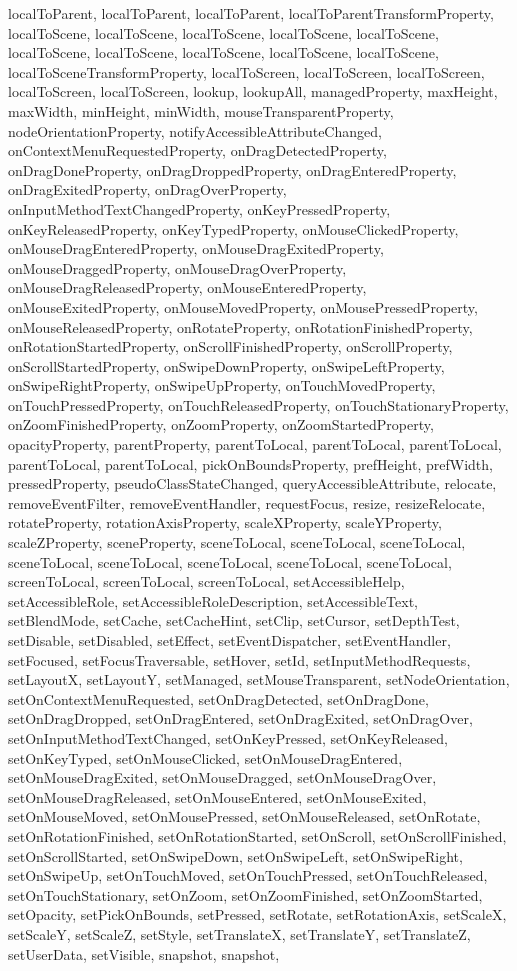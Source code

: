 {{{{{{{{{{{{{{{{{{{{{{{{{{{{{{{{{{{{localToParent, localToParent, localToParent, localToParentTransformProperty, localToScene, localToScene, localToScene, localToScene, localToScene, localToScene, localToScene, localToScene, localToScene, localToScene, localToSceneTransformProperty, localToScreen, localToScreen, localToScreen, localToScreen, localToScreen, lookup, lookupAll, managedProperty, maxHeight, maxWidth, minHeight, minWidth, mouseTransparentProperty, nodeOrientationProperty, notifyAccessibleAttributeChanged, onContextMenuRequestedProperty, onDragDetectedProperty, onDragDoneProperty, onDragDroppedProperty, onDragEnteredProperty, onDragExitedProperty, onDragOverProperty, onInputMethodTextChangedProperty, onKeyPressedProperty, onKeyReleasedProperty, onKeyTypedProperty, onMouseClickedProperty, onMouseDragEnteredProperty, onMouseDragExitedProperty, onMouseDraggedProperty, onMouseDragOverProperty, onMouseDragReleasedProperty, onMouseEnteredProperty, onMouseExitedProperty, onMouseMovedProperty, onMousePressedProperty, onMouseReleasedProperty, onRotateProperty, onRotationFinishedProperty, onRotationStartedProperty, onScrollFinishedProperty, onScrollProperty, onScrollStartedProperty, onSwipeDownProperty, onSwipeLeftProperty, onSwipeRightProperty, onSwipeUpProperty, onTouchMovedProperty, onTouchPressedProperty, onTouchReleasedProperty, onTouchStationaryProperty, onZoomFinishedProperty, onZoomProperty, onZoomStartedProperty, opacityProperty, parentProperty, parentToLocal, parentToLocal, parentToLocal, parentToLocal, parentToLocal, pickOnBoundsProperty, prefHeight, prefWidth, pressedProperty, pseudoClassStateChanged, queryAccessibleAttribute, relocate, removeEventFilter, removeEventHandler, requestFocus, resize, resizeRelocate, rotateProperty, rotationAxisProperty, scaleXProperty, scaleYProperty, scaleZProperty, sceneProperty, sceneToLocal, sceneToLocal, sceneToLocal, sceneToLocal, sceneToLocal, sceneToLocal, sceneToLocal, sceneToLocal, screenToLocal, screenToLocal, screenToLocal, setAccessibleHelp, setAccessibleRole, setAccessibleRoleDescription, setAccessibleText, setBlendMode, setCache, setCacheHint, setClip, setCursor, setDepthTest, setDisable, setDisabled, setEffect, setEventDispatcher, setEventHandler, setFocused, setFocusTraversable, setHover, setId, setInputMethodRequests, setLayoutX, setLayoutY, setManaged, setMouseTransparent, setNodeOrientation, setOnContextMenuRequested, setOnDragDetected, setOnDragDone, setOnDragDropped, setOnDragEntered, setOnDragExited, setOnDragOver, setOnInputMethodTextChanged, setOnKeyPressed, setOnKeyReleased, setOnKeyTyped, setOnMouseClicked, setOnMouseDragEntered, setOnMouseDragExited, setOnMouseDragged, setOnMouseDragOver, setOnMouseDragReleased, setOnMouseEntered, setOnMouseExited, setOnMouseMoved, setOnMousePressed, setOnMouseReleased, setOnRotate, setOnRotationFinished, setOnRotationStarted, setOnScroll, setOnScrollFinished, setOnScrollStarted, setOnSwipeDown, setOnSwipeLeft, setOnSwipeRight, setOnSwipeUp, setOnTouchMoved, setOnTouchPressed, setOnTouchReleased, setOnTouchStationary, setOnZoom, setOnZoomFinished, setOnZoomStarted, setOpacity, setPickOnBounds, setPressed, setRotate, setRotationAxis, setScaleX, setScaleY, setScaleZ, setStyle, setTranslateX, setTranslateY, setTranslateZ, setUserData, setVisible, snapshot, snapshot, }}}}}}}}}}}}}}}}}}}}}}}}}}}}}}}}}}}}
